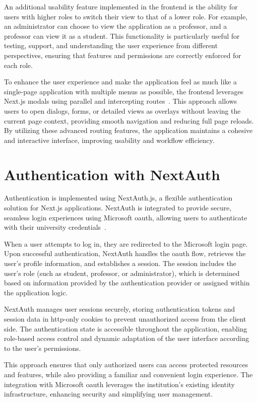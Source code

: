 An additional usability feature implemented in the frontend is the ability for users with higher roles to switch their view to that of a lower role. For example, an administrator can choose to view the application as a professor, and a professor can view it as a student. This functionality is particularly useful for testing, support, and understanding the user experience from different perspectives, ensuring that features and permissions are correctly enforced for each role.

To enhance the user experience and make the application feel as much like a single-page application with multiple menus as possible, the frontend leverages Next.js modals using parallel and intercepting routes~\cite{nextjs-app-router}. This approach allows users to open dialogs, forms, or detailed views as overlays without leaving the current page context, providing smooth navigation and reducing full page reloads. By utilizing these advanced routing features, the application maintains a cohesive and interactive interface, improving usability and workflow efficiency.

\section{Authentication with NextAuth}

Authentication is implemented using NextAuth.js, a flexible authentication solution for Next.js applications. NextAuth is integrated to provide secure, seamless login experiences using Microsoft \ac{oauth}, allowing users to authenticate with their university credentials~\cite{nextjs-authentication}.

When a user attempts to log in, they are redirected to the Microsoft login page. Upon successful authentication, NextAuth handles the \ac{oauth} flow, retrieves the user's profile information, and establishes a session. The session includes the user's role (such as student, professor, or administrator), which is determined based on information provided by the authentication provider or assigned within the application logic.

NextAuth manages user sessions securely, storing authentication tokens and session data in \ac{http}-only cookies to prevent unauthorized access from the client side. The authentication state is accessible throughout the application, enabling role-based access control and dynamic adaptation of the user interface according to the user's permissions.

This approach ensures that only authorized users can access protected resources and features, while also providing a familiar and convenient login experience. The integration with Microsoft \ac{oauth} leverages the institution's existing identity infrastructure, enhancing security and simplifying user management.

